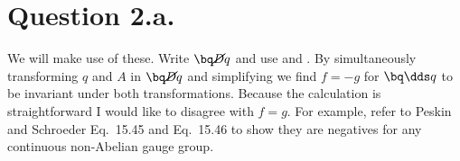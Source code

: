 \documentclass{article}
\begin{document}
\section*{Question 2.a.}
We will make use of these.
Write $\bq\cancel{D}q$ and use  and .
By simultaneously transforming $q$ and $A$ in $\bq \cancel{D} q$ and simplifying we find $f=-g$ for $\bq \dds q$ to be invariant under both transformations. Because the calculation is straightforward I would like to disagree with $f=g$. For example, refer to Peskin and Schroeder Eq.~15.45 and Eq.~15.46 to show they are negatives for any continuous non-Abelian gauge group.
\end{document}
